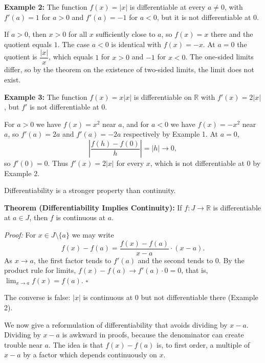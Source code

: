 \documentclass[a4paper,11pt,abstracton]{scrartcl}
\newcommand{\RR}{\mathbb{R}}
\theoremstyle{dotlessP}
\theoremstyle{dotlessS}
\theoremstyle{remark}
\theoremstyle{definition}
\begin{document}
\begin{example_box}
\textbf{Example 2:} The function $f(x)=|x|$ is differentiable at every $a\ne0$, with $f'(a)=1$ for $a>0$ and $f'(a)=-1$ for $a<0$, but it is not differentiable at $0$.
\end{example_box}
\begin{example_claim_box}
If $a>0$, then $x>0$ for all $x$ sufficiently close to $a$, so $f(x)=x$ there and the quotient equals $1$. The case $a<0$ is identical with $f(x)=-x$. At $a=0$ the quotient is $\dfrac{|x|}{x}$, which equals $1$ for $x>0$ and $-1$ for $x<0$. The one-sided limits differ, so by the theorem on the existence of two-sided limits, the limit does not exist.
\end{example_claim_box}

\begin{example_box}
\textbf{Example 3:} The function $f(x)=x|x|$ is differentiable on $\RR$ with $f'(x)=2|x|$, but $f'$ is not differentiable at $0$.
\end{example_box}
\begin{example_claim_box}
For $a>0$ we have $f(x)=x^2$ near $a$, and for $a<0$ we have $f(x)=-x^2$ near $a$, so $f'(a)=2a$ and $f'(a)=-2a$ respectively by Example 1. At $a=0$,
\[
    \left|\frac{f(h)-f(0)}{h}\right|=|h|\longrightarrow0,
\]
so $f'(0)=0$. Thus $f'(x)=2|x|$ for every $x$, which is not differentiable at $0$ by Example 2.
\end{example_claim_box}

Differentiability is a stronger property than continuity.

\begin{problem_box}
\textbf{Theorem (Differentiability Implies Continuity):}
If $f:J\to\RR$ is differentiable at $a\in J$, then $f$ is continuous at $a$.
\end{problem_box}

\begin{claim_box}
\textit{Proof:}
For $x\in J\setminus\{a\}$ we may write
\[
    f(x)-f(a)=\frac{f(x)-f(a)}{x-a}\cdot(x-a).
\]
As $x\to a$, the first factor tends to $f'(a)$ and the second tends to $0$. By the product rule for limits, $f(x)-f(a)\to f'(a)\cdot0=0$, that is, $\lim_{x\to a}f(x)=f(a)$.
\hfill$\square$
\end{claim_box}

The converse is false: $|x|$ is continuous at $0$ but not differentiable there (Example 2).

We now give a reformulation of differentiability that avoids dividing by $x-a$. Dividing by $x-a$ is awkward in proofs, because the denominator can create trouble near $a$. The idea is that $f(x)-f(a)$ is, to first order, a multiple of $x-a$ by a factor which depends continuously on $x$.
\end{document}
